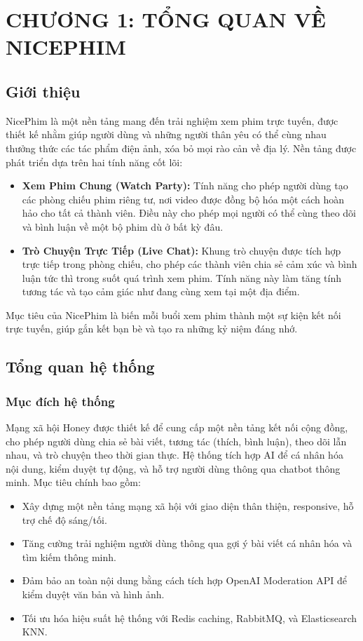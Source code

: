 
\newpage

\section{\textbf{CHƯƠNG 1: TỔNG QUAN VỀ NICEPHIM }}

\subsection{Giới thiệu} 

NicePhim là một nền tảng mang đến trải nghiệm xem phim trực tuyến, được thiết kế nhằm giúp người dùng và những người thân yêu có thể cùng nhau thưởng thức các tác phẩm điện ảnh, xóa bỏ mọi rào cản về địa lý. Nền tảng được phát triển dựa trên hai tính năng cốt lõi:

\begin{itemize}
\item \textbf{Xem Phim Chung (Watch Party):} Tính năng cho phép người dùng tạo các phòng chiếu phim riêng tư, nơi video được đồng bộ hóa một cách hoàn hảo cho tất cả thành viên. Điều này cho phép mọi người có thể cùng theo dõi và bình luận về một bộ phim dù ở bất kỳ đâu.

\item \textbf{Trò Chuyện Trực Tiếp (Live Chat):} Khung trò chuyện được tích hợp trực tiếp trong phòng chiếu, cho phép các thành viên chia sẻ cảm xúc và bình luận tức thì trong suốt quá trình xem phim. Tính năng này làm tăng tính tương tác và tạo cảm giác như đang cùng xem tại một địa điểm.
\end{itemize}

Mục tiêu của NicePhim là biến mỗi buổi xem phim thành một sự kiện kết nối trực tuyến, giúp gắn kết bạn bè và tạo ra những kỷ niệm đáng nhớ.

\subsection{Tổng quan hệ thống}
\subsubsection{Mục đích hệ thống}
Mạng xã hội Honey được thiết kế để cung cấp một nền tảng kết nối cộng đồng, cho phép người dùng chia sẻ bài viết, tương tác (thích, bình luận), theo dõi lẫn nhau, và trò chuyện theo thời gian thực. Hệ thống tích hợp AI để cá nhân hóa nội dung, kiểm duyệt tự động, và hỗ trợ người dùng thông qua chatbot thông minh. Mục tiêu chính bao gồm:
\begin{itemize}
    \item Xây dựng một nền tảng mạng xã hội với giao diện thân thiện, responsive, hỗ trợ chế độ sáng/tối.
    \item Tăng cường trải nghiệm người dùng thông qua gợi ý bài viết cá nhân hóa và tìm kiếm thông minh.
    \item Đảm bảo an toàn nội dung bằng cách tích hợp OpenAI Moderation API để kiểm duyệt văn bản và hình ảnh.
    \item Tối ưu hóa hiệu suất hệ thống với Redis caching, RabbitMQ, và Elasticsearch KNN.
\end{itemize}

